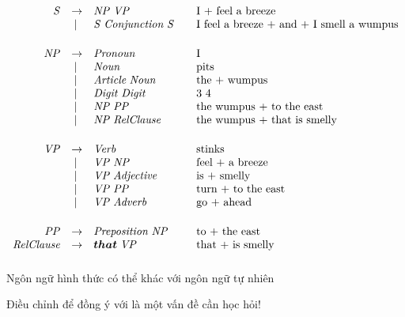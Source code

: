 \documentclass{article}
\begin{document}
\begin{huge}
\[ \begin{array}{rclcl}
\bnf{S} &\bnfeq& \bnf{NP}  \bl \bnf{VP}             && \mbox{I + feel a breeze }\\  
        & \bnfor & \bnf{S} \bl \bnf{Conjunction} \bl \bnf{S} && \mbox{I feel a
breeze + and + I smell a wumpus}\\[0.2in]
\bnf{NP} &\bnfeq& \bnf{Pronoun}                 && \mbox{I }\\
        & \bnfor & \bnf{Noun}                   && \mbox{pits }\\
        & \bnfor & \bnf{Article} \bl  \bnf{Noun}    && \mbox{the + wumpus }\\
	& \bnfor & \bnf{Digit}\bl  \bnf{Digit}	&& \mbox{3 4} \\
        & \bnfor & \bnf{NP} \bl  \bnf{PP}     && \mbox{the wumpus + to the east}\\
	& \bnfor & \bnf{NP} \bl \bnf{RelClause} && \mbox{the wumpus + that is smelly} \\[0.2in]
\bnf{VP} & \bnfeq & \bnf{Verb}                   && \mbox{stinks}\\
        & \bnfor & \bnf{VP} \bl  \bnf{NP}            && \mbox{feel + a breeze}\\
        & \bnfor & \bnf{VP} \bl  \bnf{Adjective}     && \mbox{is + smelly}\\
        & \bnfor & \bnf{VP} \bl  \bnf{PP}            && \mbox{turn + to the east}\\
        & \bnfor & \bnf{VP} \bl  \bnf{Adverb}        && \mbox{go + ahead}\\[0.2in]
\bnf{PP} & \bnfeq & \bnf{Preposition}  \bl \bnf{NP}  && \mbox{to + the east}\\
\rule[-9pt]{0pt}{10pt}\bnf{RelClause} & \bnfeq & \bnft{that} \bl \bnf{VP} &&\mbox{that + is smelly}\\
\end{array}\]




Ngôn ngữ hình thức  có thể khác với ngôn ngữ tự nhiên 

\vspace*{0.2in}

\textwidth
{}

Điều chỉnh  để đồng ý với  là một vấn đề cần học hỏi!


\end{huge}
\end{document}
